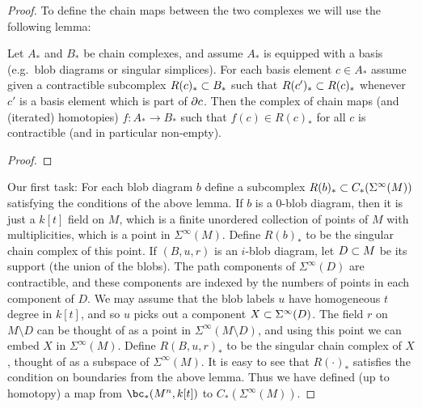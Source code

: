 \begin{proof}
To define the chain maps between the two complexes we will use the following lemma:

\begin{lemma}
Let $A_*$ and $B_*$ be chain complexes, and assume $A_*$ is equipped with
a basis (e.g.\ blob diagrams or singular simplices).
For each basis element $c \in A_*$ assume given a contractible subcomplex $R(c)_* \subset B_*$
such that $R(c')_* \subset R(c)_*$ whenever $c'$ is a basis element which is part of $\partial c$.
Then the complex of chain maps (and (iterated) homotopies) $f:A_*\to B_*$ such that
$f(c) \in R(c)_*$ for all $c$ is contractible (and in particular non-empty).
\end{lemma}

\begin{proof}
\end{proof}

Our first task: For each blob diagram $b$ define a subcomplex $R(b)_* \subset C_*(\Sigma^\infty(M))$
satisfying the conditions of the above lemma.
If $b$ is a 0-blob diagram, then it is just a $k[t]$ field on $M$, which is a 
finite unordered collection of points of $M$ with multiplicities, which is
a point in $\Sigma^\infty(M)$.
Define $R(b)_*$ to be the singular chain complex of this point.
If $(B, u, r)$ is an $i$-blob diagram, let $D\subset M$ be its support (the union of the blobs).
The path components of $\Sigma^\infty(D)$ are contractible, and these components are indexed 
by the numbers of points in each component of $D$.
We may assume that the blob labels $u$ have homogeneous $t$ degree in $k[t]$, and so
$u$ picks out a component $X \subset \Sigma^\infty(D)$.
The field $r$ on $M\setminus D$ can be thought of as a point in $\Sigma^\infty(M\setminus D)$,
and using this point we can embed $X$ in $\Sigma^\infty(M)$.
Define $R(B, u, r)_*$ to be the singular chain complex of $X$, thought of as a 
subspace of $\Sigma^\infty(M)$.
It is easy to see that $R(\cdot)_*$ satisfies the condition on boundaries from the above lemma.
Thus we have defined (up to homotopy) a map from 
$\bc_*(M^n, k[t])$ to $C_*(\Sigma^\infty(M))$.


\end{proof}
